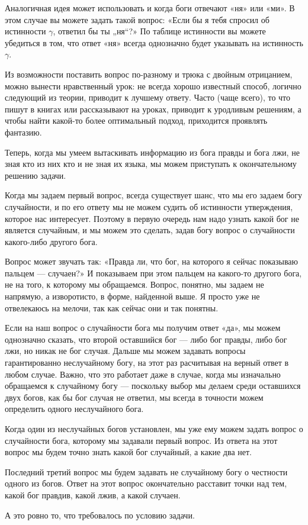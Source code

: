 Аналогичная идея может использовать и когда боги отвечают «ня» или «ми». В этом случае вы можете задать такой вопрос: «Если бы я тебя спросил об истинности $\gamma$, ответил бы ты „ня“?» По таблице истинности вы можете убедиться в том, что ответ «ня» всегда однозначно будет указывать на истинность $\gamma$.

Из возможности поставить вопрос по-разному и трюка с двойным отрицанием, можно вынести нравственный урок: не всегда хорошо известный способ, логично следующий из теории, приводит к лучшему ответу. Часто (чаще всего), то что пишут в книгах или рассказывают на уроках, приводит к уродливым решениям, а чтобы найти какой-то более оптимальный подход, приходится проявлять фантазию.

Теперь, когда мы умеем вытаскивать информацию из бога правды и бога лжи, не зная кто из них кто и не зная их языка, мы можем приступать к окончательному решению задачи.

Когда мы задаем первый вопрос, всегда существует шанс, что мы его задаем богу случайности, и по его ответу мы не можем судить об истинности утверждения, которое нас интересует. Поэтому в первую очередь нам надо узнать какой бог не является случайным, и мы можем это сделать, задав богу вопрос о случайности какого-либо другого бога.

Вопрос может звучать так: «Правда ли, что бог, на которого я сейчас показываю пальцем — случаен?» И показываем при этом пальцем на какого-то другого бога, не на того, к которому мы обращаемся. Вопрос, понятно, мы задаем не напрямую, а изворотисто, в форме, найденной выше. Я просто уже не отвелекаюсь на мелочи, так как сейчас они и так понятны.

Если на наш вопрос о случайности бога мы получим ответ «да», мы можем однозначно сказать, что второй оставшийся бог — либо бог правды, либо бог лжи, но никак не бог случая. Дальше мы можем задавать вопросы гарантированно неслучайному богу, на этот раз расчитывая на верный ответ в любом случае. Важно, что это работает даже в случае, когда мы изначально обращаемся к случайному богу — поскольку выбор мы делаем среди оставшихся двух богов, как бы бог случая не ответил, мы всегда в точности можем определить одного неслучайного бога.

Когда один из неслучайных богов установлен, мы уже ему можем задать вопрос о случайности бога, которому мы задавали первый вопрос. Из ответа на этот вопрос мы будем точно знать какой бог случайный, а какие два нет.

Последний третий вопрос мы будем задавать не случайному богу о честности одного из богов. Ответ на этот вопрос окончательно расставит точки над тем, какой бог правдив, какой лжив, а какой случаен.

А это ровно то, что требовалось по условию задачи.
